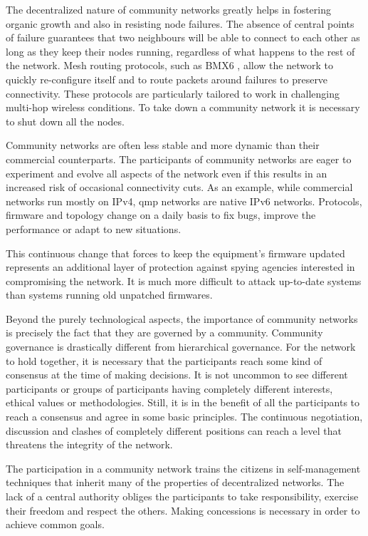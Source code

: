 \documentclass[journal]{IEEEtran}
\begin{document}
The decentralized nature of community networks greatly helps in fostering organic growth and also in  resisting node failures.
The absence of central points of failure guarantees that two neighbours will be able to connect to each other as long as they keep their nodes running, regardless of what happens to the rest of the network.
Mesh routing protocols, such as BMX6 \cite{neumann2012ebc}, allow the network to quickly re-configure itself and to route packets around failures to preserve connectivity.
These protocols are particularly tailored to work in challenging multi-hop wireless conditions.
To take down a community network it is necessary to shut down all the nodes.

Community networks are often less stable and more dynamic than their commercial counterparts.
The participants of community networks are eager to experiment and evolve all aspects of the network even if this results in an increased risk of occasional connectivity cuts.
As an example, while commercial networks run mostly on IPv4, qmp networks are native IPv6 networks.
Protocols, firmware and topology change on a daily basis to fix bugs, improve the performance or adapt to new situations.

This continuous change that forces to keep the equipment's firmware updated represents  an additional layer of protection against spying agencies interested in compromising the network.
It is much more difficult to attack up-to-date systems than systems running old unpatched firmwares.

Beyond the purely technological aspects, the importance of community networks is precisely the fact that they are governed by a community.
Community governance is drastically different from hierarchical governance.
For the network to hold together, it is necessary that the participants reach some kind of consensus at the time of making decisions.
It is not uncommon to see different participants or groups of participants having completely different interests, ethical values or methodologies.
Still, it is in the benefit of all the participants to reach a consensus and agree in some basic principles.
The continuous negotiation, discussion and clashes of completely different positions can reach a level that threatens the integrity of the network.

The participation in a community network trains the citizens in self-management techniques that inherit many of the properties of decentralized networks.
The lack of a central authority obliges the participants to take responsibility, exercise their freedom and respect the others.
Making concessions is necessary in order to achieve common goals.
\end{document}
